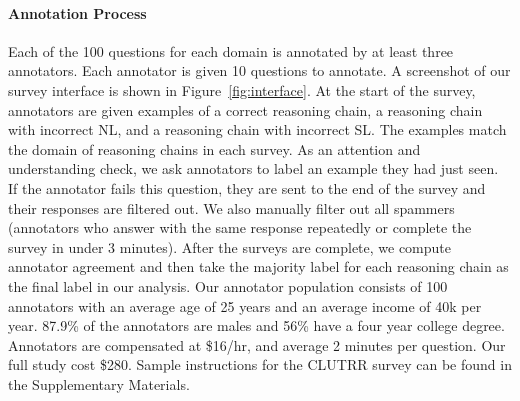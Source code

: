\paragraph{Annotation Process} Each of the 100 questions for each domain is annotated by at least three annotators. Each annotator is given 10 questions to annotate. A screenshot of our survey interface is shown in Figure~\ref{fig:interface}. At the start of the survey, annotators are given examples of a correct reasoning chain, a reasoning chain with incorrect NL, and a reasoning chain with incorrect SL. The examples match the domain of reasoning chains in each survey. As an attention and understanding check, we ask annotators to label an example they had just seen. If the annotator fails this question, they are sent to the end of the survey and their responses are filtered out. We also manually filter out all spammers (annotators who answer with the same response repeatedly or complete the survey in under 3 minutes). After the surveys are complete, we compute annotator agreement and then take the majority label for each reasoning chain as the final label in our analysis.
Our annotator population consists of 100 annotators with an average age of 25 years and an average income of 40k per year. 87.9\% of the annotators are males and 56\% have a four year college degree.
Annotators are compensated at \$16/hr, and average 2 minutes per question. Our full study cost \$280. Sample instructions for the CLUTRR survey can be found in the Supplementary Materials.